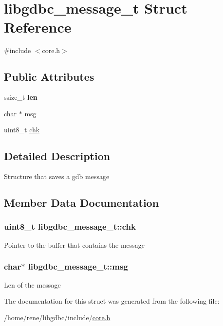 \hypertarget{structlibgdbc__message__t}{\section{libgdbc\-\_\-message\-\_\-t Struct Reference}
\label{structlibgdbc__message__t}
}


{\ttfamily \#include $<$core.\-h$>$}

\subsection*{Public Attributes}
\begin{DoxyCompactItemize}
\item 
\hypertarget{structlibgdbc__message__t_ac0abc69f06d2d369e8389c3ad94b5d54}{ssize\-\_\-t {\bfseries len}}\label{structlibgdbc__message__t_ac0abc69f06d2d369e8389c3ad94b5d54}

\item 
char $\ast$ \hyperlink{structlibgdbc__message__t_a1c56f783465a548cb33ef3cee5f8ddef}{msg}
\item 
uint8\-\_\-t \hyperlink{structlibgdbc__message__t_a4fd9aded3e38a6d5f5fc1a80b9bee8c3}{chk}
\end{DoxyCompactItemize}


\subsection{Detailed Description}
Structure that saves a gdb message 

\subsection{Member Data Documentation}
\hypertarget{structlibgdbc__message__t_a4fd9aded3e38a6d5f5fc1a80b9bee8c3}{
\subsubsection[{chk}]{\setlength{\rightskip}{0pt plus 5cm}uint8\-\_\-t libgdbc\-\_\-message\-\_\-t\-::chk}}\label{structlibgdbc__message__t_a4fd9aded3e38a6d5f5fc1a80b9bee8c3}
Pointer to the buffer that contains the message \hypertarget{structlibgdbc__message__t_a1c56f783465a548cb33ef3cee5f8ddef}{
\subsubsection[{msg}]{\setlength{\rightskip}{0pt plus 5cm}char$\ast$ libgdbc\-\_\-message\-\_\-t\-::msg}}\label{structlibgdbc__message__t_a1c56f783465a548cb33ef3cee5f8ddef}
Len of the message 

The documentation for this struct was generated from the following file\-:\begin{DoxyCompactItemize}
\item 
/home/rene/libgdbc/include/\hyperlink{core_8h}{core.\-h}\end{DoxyCompactItemize}
